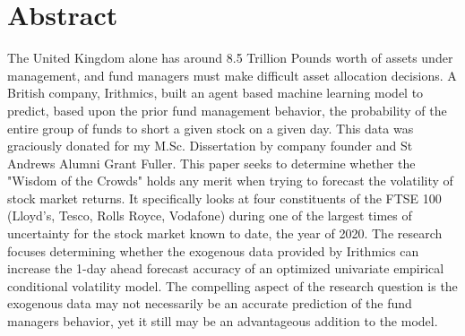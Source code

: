 
\chapter*{Abstract}
The United Kingdom alone has around 8.5 Trillion Pounds worth of assets under management, and fund managers must make difficult asset allocation decisions. A British company, Irithmics, built an agent based machine learning model to predict, based upon the prior fund management behavior, the probability of the entire group of funds to short a given stock on a given day. This data was graciously donated for my M.Sc. Dissertation by company founder and St Andrews Alumni Grant Fuller. This paper seeks to determine whether the "Wisdom of the Crowds" holds any merit when trying to forecast the volatility of stock market returns. It specifically looks at four constituents of the FTSE 100 (Lloyd's, Tesco, Rolls Royce, Vodafone) during one of the largest times of uncertainty for the stock market known to date, the year of 2020. The research focuses determining whether the exogenous data provided by Irithmics can increase the 1-day ahead forecast accuracy of an optimized univariate empirical conditional volatility model. The compelling aspect of the research question is the exogenous data may not necessarily be an accurate prediction of the fund managers behavior, yet it still may be an advantageous addition to the model.   
